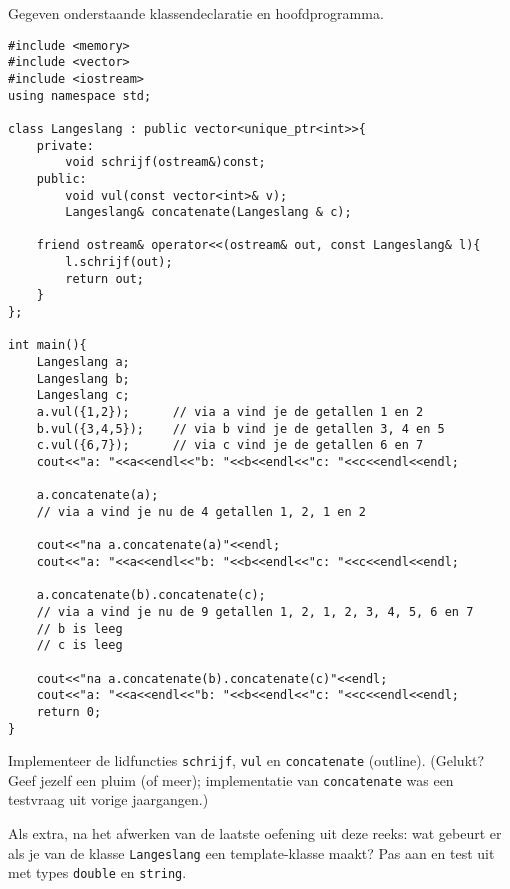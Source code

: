 \beginoef
Gegeven onderstaande klassendeclaratie en hoofdprogramma. 
\begin{footnotesize}
\begin{verbatim}
#include <memory>
#include <vector>
#include <iostream>
using namespace std;

class Langeslang : public vector<unique_ptr<int>>{
    private:		
        void schrijf(ostream&)const;
    public:
        void vul(const vector<int>& v);
        Langeslang& concatenate(Langeslang & c);
		
    friend ostream& operator<<(ostream& out, const Langeslang& l){
        l.schrijf(out);
        return out;	
    }	
};

int main(){
    Langeslang a;
    Langeslang b;
    Langeslang c;
    a.vul({1,2});      // via a vind je de getallen 1 en 2
    b.vul({3,4,5});    // via b vind je de getallen 3, 4 en 5
    c.vul({6,7});      // via c vind je de getallen 6 en 7
    cout<<"a: "<<a<<endl<<"b: "<<b<<endl<<"c: "<<c<<endl<<endl;
	
    a.concatenate(a);	
    // via a vind je nu de 4 getallen 1, 2, 1 en 2
		
    cout<<"na a.concatenate(a)"<<endl;
    cout<<"a: "<<a<<endl<<"b: "<<b<<endl<<"c: "<<c<<endl<<endl;
	
    a.concatenate(b).concatenate(c);
    // via a vind je nu de 9 getallen 1, 2, 1, 2, 3, 4, 5, 6 en 7
    // b is leeg
    // c is leeg
    
    cout<<"na a.concatenate(b).concatenate(c)"<<endl;
    cout<<"a: "<<a<<endl<<"b: "<<b<<endl<<"c: "<<c<<endl<<endl;
    return 0;
}
\end{verbatim}
\end{footnotesize}

Implementeer de lidfuncties \verb}schrijf}, \verb}vul} en \verb}concatenate} (outline). 
(Gelukt? Geef jezelf een pluim (of meer); implementatie van \verb}concatenate} was een testvraag uit vorige jaargangen.)

Als extra, na het afwerken van de laatste oefening uit deze reeks: wat gebeurt er als je van de klasse 
\verb}Langeslang} een template-klasse maakt? Pas aan en test uit met types \verb}double} en \verb}string}.

\endoef
